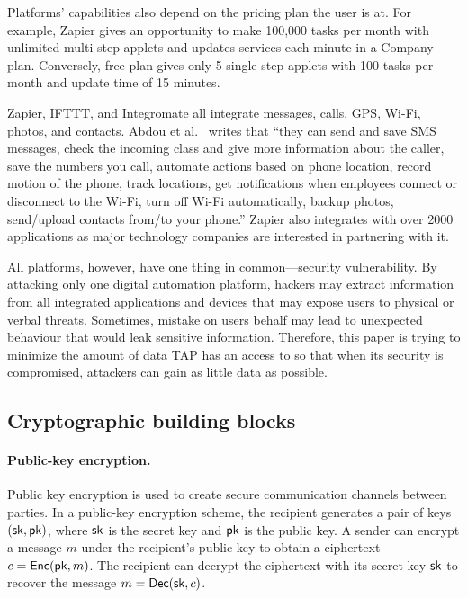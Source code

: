 Platforms' capabilities also depend on the pricing plan the user is at. For
example, Zapier gives an opportunity to make 100,000 tasks per month with
unlimited multi-step applets and updates services each minute in a Company
plan. Conversely, free plan gives only 5 single-step applets with 100 tasks per
month and update time of 15 minutes.

Zapier, IFTTT, and Integromate all integrate messages, calls, GPS, Wi-Fi,
photos, and contacts. Abdou et al.~\cite{DBLP:conf/icict2/AbdouEF21} writes that
``they can send and save SMS messages, check the incoming class and give more
information about the caller, save the numbers you call, automate actions based
on phone location, record motion of the phone, track locations, get
notifications when employees connect or disconnect to the Wi-Fi, turn off Wi-Fi
automatically, backup photos, send/upload contacts from/to your phone.'' Zapier
also integrates with over 2000 applications as major technology companies are
interested in partnering with it.

All platforms, however, have one thing in common---security vulnerability. By
attacking only one digital automation platform, hackers may extract information
from all integrated applications and devices that may expose users to physical
or verbal threats. Sometimes, mistake on users behalf may lead to unexpected
behaviour that would leak sensitive information. Therefore, this paper is trying
to minimize the amount of data TAP has an access to so that when its security is
compromised, attackers can gain as little data as possible.

\subsection{Cryptographic building blocks}

\paragraph{Public-key encryption.}

Public key encryption is used to create secure communication channels between
parties. In a public-key encryption scheme, the recipient generates a pair of
keys $(\mathsf{sk}, \mathsf{pk})$, where $\mathsf{sk}$ is the secret key and $\mathsf{pk}$ is the public key. A
sender can encrypt a message $m$ under the recipient's public key to obtain a
ciphertext $c = \mathsf{Enc}(\mathsf{pk}, m)$. The recipient can decrypt the ciphertext with its
secret key $\mathsf{sk}$ to recover the message $m = \mathsf{Dec}(\mathsf{sk}, c)$.

